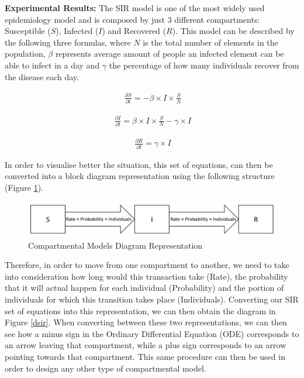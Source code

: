 \textbf{Experimental Results:} The SIR model is one of the most widely used epidemiology model and is composed by just 3 different compartments: Susceptible ($S$), Infected ($I$) and Recovered ($R$). This model can be described by the following three formulas, where 
$N$ is the total number of elements in the population, $\beta$ represents average amount of people an infected element can be able to infect in a day and
$\gamma$ the percentage of how many individuals recover from the disease each day.

\useshortskip
\begin{align}
\ \frac{\partial S}{\partial t} = -\beta \times I \times \frac{S}{N}
\end{align}
\useshortskip

\useshortskip
\begin{align}
\ \frac{\partial I}{\partial t} = \beta \times I \times \frac{S}{N} -\gamma \times I
\end{align}
\useshortskip

\useshortskip
\begin{align}
\ \frac{\partial R}{\partial t} = \gamma \times I
\end{align}
\useshortskip

In order to visualise better the situation, this set of equations, can then be converted into a block diagram representation using the following structure (Figure \ref{comp}).

\begin{figure}[ht!]%
    \centering
    \includegraphics[width=13cm]{latex/images/comp.PNG}%
    \caption{Compartmental Models Diagram Representation}
    \label{comp}
\end{figure}

Therefore, in order to move from one compartment to another, we need to take into consideration how long would this transaction take (Rate), the probability that it will actual happen for each individual (Probability) and the portion of individuals for which this transition takes place (Individuals). Converting our SIR set of equations into this representation, we can then obtain the diagram in Figure \ref{dsir}. When converting between these two representations, we can then see how a minus sign in the Ordinary Differential Equation (ODE) corresponds to an arrow leaving that compartment, while a plus sign corresponds to an arrow pointing towards that compartment. This same procedure can then be used in order to design any other type of compartmental model.

